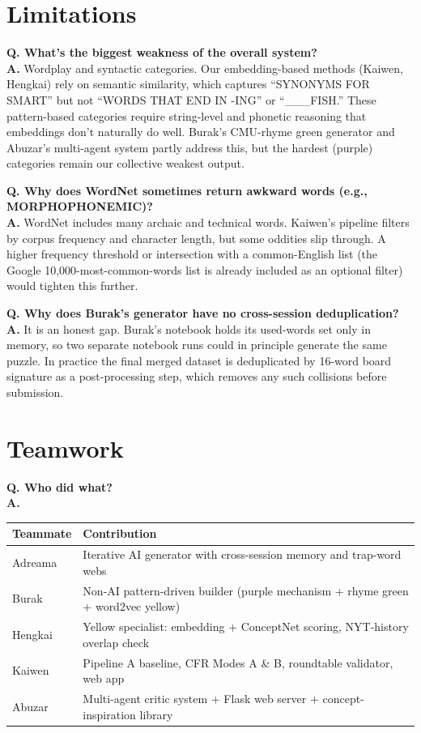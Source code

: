 \documentclass[11pt, letterpaper]{article}
\newcommand{\qitem}[1]{\vspace{0.6em}\noindent\textbf{\color{accent}Q. #1}\\[0.2em]}
\newcommand{\aitem}{\noindent\textbf{A.} }
\begin{document}
\section*{Limitations}

\qitem{What's the biggest weakness of the overall system?}
\aitem
Wordplay and syntactic categories. Our embedding-based methods (Kaiwen,
Hengkai) rely on semantic similarity, which captures ``SYNONYMS FOR SMART''
but not ``WORDS THAT END IN -ING'' or ``\_\_\_FISH.'' These pattern-based
categories require string-level and phonetic reasoning that embeddings
don't naturally do well. Burak's CMU-rhyme green generator and Abuzar's
multi-agent system partly address this, but the hardest (purple) categories
remain our collective weakest output.

\qitem{Why does WordNet sometimes return awkward words (e.g., MORPHOPHONEMIC)?}
\aitem
WordNet includes many archaic and technical words. Kaiwen's pipeline filters
by corpus frequency and character length, but some oddities slip through. A
higher frequency threshold or intersection with a common-English list (the
Google 10{,}000-most-common-words list is already included as an optional
filter) would tighten this further.

\qitem{Why does Burak's generator have no cross-session deduplication?}
\aitem
It is an honest gap. Burak's notebook holds its used-words set only in
memory, so two separate notebook runs could in principle generate the same
puzzle. In practice the final merged dataset is deduplicated by
16-word board signature as a post-processing step, which removes any such
collisions before submission.

\section*{Teamwork}

\qitem{Who did what?}
\aitem
\begin{center}
\begin{tabular}{ll}
\toprule
\textbf{Teammate} & \textbf{Contribution} \\
\midrule
Adreama & Iterative AI generator with cross-session memory and trap-word webs \\
Burak   & Non-AI pattern-driven builder (purple mechanism + rhyme green + word2vec yellow) \\
Hengkai & Yellow specialist: embedding + ConceptNet scoring, NYT-history overlap check \\
Kaiwen  & Pipeline A baseline, CFR Modes A \& B, roundtable validator, web app \\
Abuzar  & Multi-agent critic system + Flask web server + concept-inspiration library \\
\bottomrule
\end{tabular}
\end{center}
\end{document}

